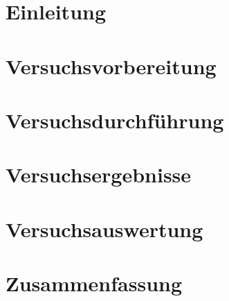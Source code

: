 % 



%


\pagestyle{empty}

%
\tableofcontents
%
\newpage
\pagestyle{headings}
\section{Einleitung}
\label{sec:Einleitung}

\clearpage
%

\section{Versuchsvorbereitung}
\label{sec:Vorbereitung}

\clearpage
%
\section{Versuchsdurchführung}
\label{sec:Durchführung}

\clearpage
%
\section{Versuchsergebnisse}
\label{sec:Ergebnisse}

\clearpage
%
\section{Versuchsauswertung}
\label{sec:Auswertung}

\clearpage
%
\section{Zusammenfassung}
\label{sec:Zusammenfassung}

\clearpage
%
\listoftables
\newpage
%
\listoffigures
\newpage
%
%

\newpage
%
%
%

%
